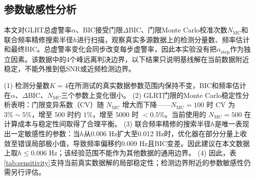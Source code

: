 \documentclass[withoutpreface,bwprint]{cumcmthesis}
\begin{document}
\subsection{参数敏感性分析}
本文对GLRT总虚警率$\alpha$、BIC接受门限$\Delta$BIC、门限Monte Carlo校准次数$N_{\text{MC}}$和联合频率精修搜索半径$h$进行扫描，观察真实多源数据上的检测分量数、频率估计和最终BIC。总虚警率变化会同步改变每步虚警率，因此本实验没有把$\alpha_{\text{step}}$作为独立因素。该数据中的4个峰远离判决边界，以下结果只说明基线解在当前数据附近稳定，不能外推到低SNR或近频检测边界。

\begin{table}[H]
\centering
\caption{参数敏感性分析结果}\label{tab:sensitivity}
\end{table}

\FloatBarrier

(1) 检测分量数$K=4$在所测试的真实数据参数范围内保持不变，BIC和频率估计在$\alpha$、$\Delta$BIC、$N_{\text{MC}}$三个参数上变化很小。
(2) GLRT门限的Monte Carlo稳定性分析表明：门限变异系数（CV）随 $N_{\text{MC}}$ 增大而下降——$N_{\text{MC}}=100$ 时 CV 为 $3\%\sim5\%$，增至 $500$ 时约 $1\%$，增至 $5000$ 时 $<0.5\%$。当前使用的 $N_{\text{MC}}=500$ 在计算成本与稳定性间取得了合理平衡。
(3) 联合频率精修的搜索半径$h$是唯一表现出一定敏感性的参数：当$h$从0.006 Hz扩大至0.012 Hz时，优化器在部分分量上收敛至错误局部极小值，导致频率偏移约$0.009$ Hz且BIC变差。因此建议在本文数据上取$h\leq 0.006$ Hz；该经验范围不能作为其他数据的通用边界。
(4) 因此，表\ref{tab:sensitivity}支持当前真实数据解的局部稳定性；检测边界附近的参数敏感性仍需另行评估。
\end{document}
